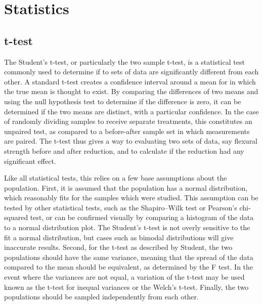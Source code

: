 

\chapter{Statistics}

\section{t-test}
    \label{app:ttest}
    The Student's t-test, or particularly the two sample t-test, is a statistical test commonly used to determine if to sets of data are significantly different from each other.
    A standard t-test creates a confidence interval around a mean for in which the true mean is thought to exist.
    By comparing the differences of two means and using the null hypothesis test to determine if the difference is zero, it can be determined if the two means are distinct, with a particular confidence.
    In the case of randomly dividing samples to receive separate treatments, this constitutes an unpaired test, as compared to a before-after sample set in which measurements are paired.
    The t-test thus gives a way to evaluating two sets of data, say flexural strength before and after reduction, and to calculate if the reduction had any significant effect.

    Like all statistical tests, this relies on a few base assumptions about the population.
    First, it is assumed that the population has a normal distribution, which reasonably fits for the samples which were studied.
    This assumption can be tested by other statistical tests, such as the Shapiro–Wilk test or Pearson's chi-squared test, or can be confirmed visually by comparing a histogram of the data to a normal distribution plot.
    The Student's t-test is not overly sensitive to the fit a normal distribution, but cases such as bimodal distributions will give inaccurate results.
    Second, for the t-test as described by Student, the two populations should have the same variance, meaning that the spread of the data compared to the mean should be equivalent, as determined by the F test.
    In the event where the variances are not equal, a variation of the t-test may be used known as the t-test for inequal variances or the Welch's t-test.
    Finally, the two populations should be sampled independently from each other.

